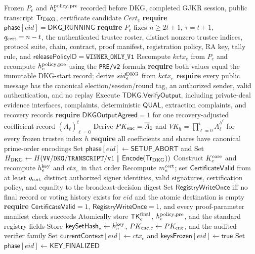 \documentclass[pdflatex,sn-mathphys-num]{sn-jnl}%
\theoremstyle{thmstyleone}%
\theoremstyle{thmstyletwo}%
\theoremstyle{thmstylethree}%
\begin{document}
\begin{appendices}
\begin{algorithm}[H]
\caption{$\mathsf{FinalizeThresholdKey}(eid)$}
\label{alg:threshold-key-finalize}
\begin{algorithmic}[1]
\Require Frozen $P_e$ and $h_e^{\rm policy,pre}$ recorded before DKG, completed GJKR session, public transcript $\mathsf{Tr}_{\rm DKG}$, certificate candidate $Cert_e$
\State \textbf{require} $\mathsf{phase}[eid]=\mathsf{DKG\_RUNNING}$
\State \textbf{require} $P_e$ fixes $n\geq2t+1$, $\tau=t+1$, $q_{\rm cert}=n-t$, the authenticated trustee roster, distinct nonzero trustee indices, protocol suite, chain, contract, proof manifest, registration policy, RA key, tally rule, and $\mathsf{releasePolicyID}=\mathtt{WINNER\_ONLY\_V1}$
\State Recompute $kctx_e$ from $P_e$ and recompute $h_e^{\rm policy,pre}$ using the \texttt{PRE/v2} formula
\State \textbf{require} both values equal the immutable DKG-start record; derive $sid_e^{\rm DKG}$ from $kctx_e$
\State \textbf{require} every public message has the canonical election/session/round tag, an authorized sender, valid authentication, and no replay
\State Execute $\mathsf{TDKG.VerifyOutput}$, including private-deal evidence interfaces, complaints, deterministic $\mathsf{QUAL}$, extraction complaints, and recovery records
\State \textbf{require} $\mathsf{DKGOutputAgreed}=1$ for one recovery-adjusted coefficient record $(\overline A_\ell)_{\ell=0}^{t}$
\State Derive $PK_{\rm enc}=\overline A_0$ and $VK_h=\prod_{\ell=0}^{t}\overline A_\ell^{h^\ell}$ for every frozen trustee index $h$
\State \textbf{require} all coefficients and shares have canonical prime-order encodings
  \State Set $\mathsf{phase}[eid]\gets\mathsf{SETUP\_ABORT}$ and \Return
\EndIf
\State Set $H_{\rm DKG}\gets H(\mathtt{VV/DKG/TRANSCRIPT/v1}\parallel\mathsf{Encode}(\mathsf{Tr}_{\rm DKG}))$
\State Construct $K_e^{\rm core}$ and recompute $h_e^{\rm key}$ and $ctx_e$ in that order
\State Recompute $m_e^{\rm cert}$; set $\mathsf{CertificateValid}$ from at least $q_{\rm cert}$ distinct authorized signer identities, valid signatures, certification policy, and equality to the broadcast-decision digest
\State Set $\mathsf{RegistryWriteOnce}$ iff no final record or voting history exists for $eid$ and the atomic destination is empty
\State \textbf{require} $\mathsf{CertificateValid}=1$, $\mathsf{RegistryWriteOnce}=1$, and every proof-parameter manifest check succeeds
\State Atomically store $\mathsf{TK}_e^{\rm final}$, $h_e^{\rm policy,pre}$, and the standard registry fields
\State Store $\mathsf{keySetHash}_e\gets h_e^{\rm key}$, $PK_{{\rm enc},e}\gets PK_{\rm enc}$, and the audited verifier family
\State Set $\mathsf{currentContext}[eid]\gets ctx_e$ and $\mathsf{keysFrozen}[eid]\gets\mathsf{true}$
\State Set $\mathsf{phase}[eid]\gets\mathsf{KEY\_FINALIZED}$
\end{algorithmic}
\end{algorithm}


\end{appendices}
\end{document}
